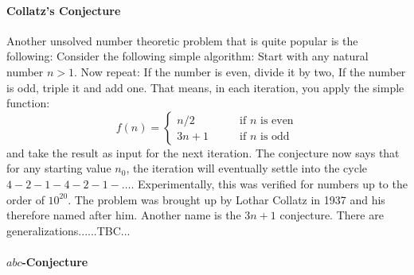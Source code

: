 

\paragraph{Collatz's Conjecture}
Another unsolved number theoretic problem that is quite popular is the following: Consider the following simple algorithm: Start with any natural number $n > 1$. Now repeat: If the number is even, divide it by two, If the number is odd, triple it and add one. That means, in each iteration, you apply the simple function:
\begin{equation}
f(n) = \begin{cases}
n/2    \qquad & \text{if $n$ is even}  \\
3n + 1 \qquad & \text{if $n$ is odd}
\end{cases}
\end{equation}
and take the result as input for the next iteration. The conjecture now says that for any starting value $n_0$, the iteration will eventually settle into the cycle $4-2-1-4-2-1-\ldots$. Experimentally, this was verified for numbers up to the order of $10^{20}$. The problem was brought up by Lothar Collatz in 1937 and his therefore named after him. Another name is the $3n + 1$ conjecture. There are generalizations......TBC...




\paragraph{$abc$-Conjecture}



\begin{comment}
-Modular addition and multiplication
-Modular exponentiation, logarithms and roots
-Chinese Remainder Theorem
\end{comment}